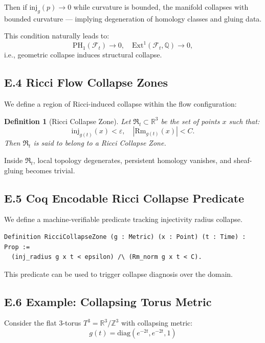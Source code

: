 \documentclass[11pt]{article}
\newtheorem{definition}[theorem]{Definition}
\begin{document}
Then if \( \mathrm{inj}_g(p) \to 0 \) while curvature is bounded, the manifold collapses with bounded curvature --- implying degeneration of homology classes and gluing data.

This condition naturally leads to:
\[
\mathrm{PH}_1(\mathcal{F}_t) \to 0, \quad \mathrm{Ext}^1(\mathcal{F}_t, \mathbb{Q}) \to 0,
\]
i.e., geometric collapse induces structural collapse.

\subsection{E.4 Ricci Flow Collapse Zones}

We define a region of Ricci-induced collapse within the flow configuration:

\begin{definition}[Ricci Collapse Zone]
Let \( \mathfrak{R}_t \subset \mathbb{R}^3 \) be the set of points \( x \) such that:
\[
\mathrm{inj}_{g(t)}(x) < \varepsilon, \quad |\mathrm{Rm}_{g(t)}(x)| < C.
\]
Then \( \mathfrak{R}_t \) is said to belong to a Ricci Collapse Zone.
\end{definition}

Inside \( \mathfrak{R}_t \), local topology degenerates, persistent homology vanishes, and sheaf-gluing becomes trivial.

\subsection{E.5 Coq Encodable Ricci Collapse Predicate}

We define a machine-verifiable predicate tracking injectivity radius collapse.

\begin{lstlisting}[language=Coq, caption=Ricci Collapse Condition]
Definition RicciCollapseZone (g : Metric) (x : Point) (t : Time) : Prop :=
  (inj_radius g x t < epsilon) /\ (Rm_norm g x t < C).
\end{lstlisting}

This predicate can be used to trigger collapse diagnosis over the domain.

\subsection{E.6 Example: Collapsing Torus Metric}

Consider the flat 3-torus \( T^3 = \mathbb{R}^3/\mathbb{Z}^3 \) with collapsing metric:
\[
g(t) = \mathrm{diag}(e^{-2t}, e^{-2t}, 1)
\]
\end{document}
